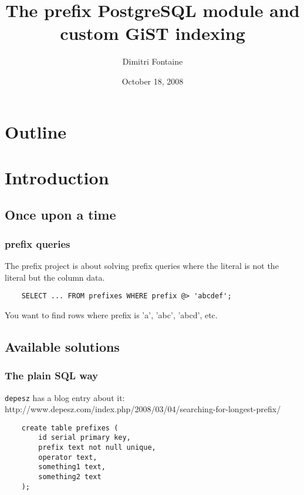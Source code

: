 \documentclass{beamer}
\title{The prefix PostgreSQL module and custom GiST indexing}
\author{Dimitri Fontaine}
\date{October 18, 2008}
\begin{document}
\frame{\titlepage}

\section*{Outline}

\section{Introduction}
\subsection{Once upon a time}

\begin{frame}[fragile]
  \frametitle{prefix queries}

  The \alert{prefix} project is about solving prefix queries where the
  literal is not the literal but the column data.

  \begin{example}
  \begin{verbatim}
    SELECT ... FROM prefixes WHERE prefix @> 'abcdef';
  \end{verbatim}
  \end{example}

  You want to find rows where prefix is 'a', 'abc', 'abcd', etc.
\end{frame}

\subsection{Available solutions}

\begin{frame}[fragile]
  \frametitle{The plain SQL way}
  
  \texttt{depesz} has a blog entry about it:
  http://www.depesz.com/index.php/2008/03/04/searching-for-longest-prefix/
  
  \begin{example}
  \begin{verbatim}
    create table prefixes (
        id serial primary key,
        prefix text not null unique,
        operator text,
        something1 text,
        something2 text
    );
  \end{verbatim}
  \end{example}
\end{frame}
  
\end{document}
